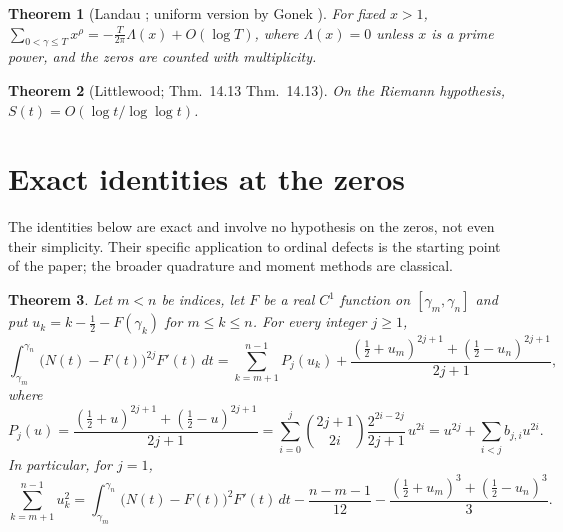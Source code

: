 \documentclass[11pt,reqno]{amsart}
\makeatletter
\let\CG@origcite\cite
\renewcommand*{\cite}[2][]{\def\CG@citekey{#2}%
  \ifx\relax#1\relax\CG@origcite{#2}\else\CG@origcite[#1]{#2}\fi}
\numberwithin{equation}{section}
\theoremstyle{plain}
\newtheorem{theorem}{Theorem}[section]
\theoremstyle{definition}
\theoremstyle{remark}
\makeatother
\begin{document}
\begin{theorem}[Landau {\cite{Landau1912}}; uniform version by Gonek {\cite{Gonek1993}}]\label{thm:known_landau}
For fixed $x>1$, $\sum_{0<\gamma\le T}x^{\rho}=-\frac T{2\pi}\Lambda(x)+O(\log T)$, where $\Lambda(x)=0$ unless $x$ is a prime power, and the zeros are counted with multiplicity.
\end{theorem}

\begin{theorem}[Littlewood; {\cite[Thm.~14.13]{Titchmarsh1986}}]\label{thm:known_RH_S}
On the Riemann hypothesis, $S(t)=O(\log t/\log\log t)$.
\end{theorem}

\section{Exact identities at the zeros}
\label{sec:identities}

The identities below are exact and involve no hypothesis on the zeros, not even their simplicity. Their specific application to ordinal defects is the starting point of the paper; the broader quadrature and moment methods are classical.

\begin{theorem}\label{thm:identity_general}
Let $m<n$ be indices, let $F$ be a real $C^1$ function on $[\gamma_m,\gamma_n]$ and put $u_k=k-\frac12-F(\gamma_k)$ for $m\le k\le n$. For every integer $j\ge1$,
\begin{equation}
\int_{\gamma_m}^{\gamma_n}\bigl(N(t)-F(t)\bigr)^{2j}F'(t)\,dt=\sum_{k=m+1}^{n-1}P_j(u_k)+\frac{(\frac12+u_m)^{2j+1}+(\frac12-u_n)^{2j+1}}{2j+1},
\label{eq:identity_general}
\end{equation}
where
\begin{equation}
P_j(u)=\frac{(\frac12+u)^{2j+1}+(\frac12-u)^{2j+1}}{2j+1}=\sum_{i=0}^{j}\binom{2j+1}{2i}\frac{2^{2i-2j}}{2j+1}\,u^{2i}=u^{2j}+\sum_{i<j}b_{j,i}u^{2i}.
\label{eq:Pj_def}
\end{equation}
In particular, for $j=1$,
\begin{equation}
\sum_{k=m+1}^{n-1}u_k^2=\int_{\gamma_m}^{\gamma_n}\bigl(N(t)-F(t)\bigr)^2F'(t)\,dt-\frac{n-m-1}{12}-\frac{(\frac12+u_m)^3+(\frac12-u_n)^3}3 .
\label{eq:identity_quadratic}
\end{equation}
\end{theorem}
\end{document}
